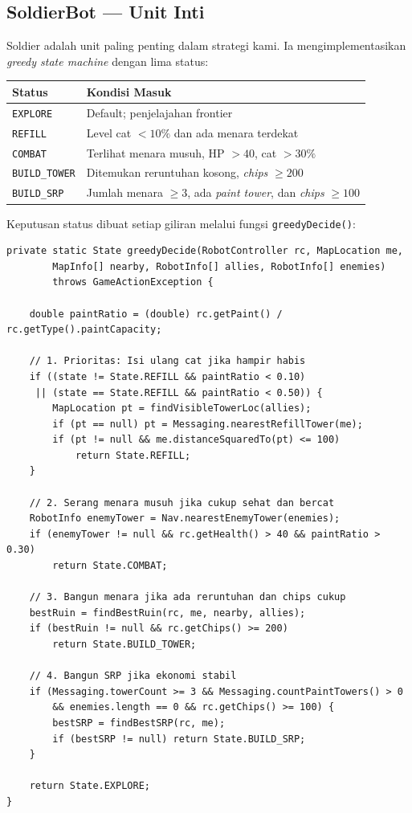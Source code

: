 \documentclass[12pt, a4paper]{article}
\begin{document}
\subsection{SoldierBot --- Unit Inti}

Soldier adalah unit paling penting dalam strategi kami. Ia mengimplementasikan
\textit{greedy state machine} dengan lima status:

\begin{center}
\begin{tabular}{ll}
\toprule
\textbf{Status} & \textbf{Kondisi Masuk} \\
\midrule
\texttt{EXPLORE}     & Default; penjelajahan frontier \\
\texttt{REFILL}      & Level cat $< 10\%$ dan ada menara terdekat \\
\texttt{COMBAT}      & Terlihat menara musuh, HP $> 40$, cat $> 30\%$ \\
\texttt{BUILD\_TOWER} & Ditemukan reruntuhan kosong, \textit{chips} $\geq 200$ \\
\texttt{BUILD\_SRP}  & Jumlah menara $\geq 3$, ada \textit{paint tower}, dan \textit{chips} $\geq 100$ \\
\bottomrule
\end{tabular}
\end{center}

\noindent Keputusan status dibuat setiap giliran melalui fungsi \texttt{greedyDecide()}:

\begin{lstlisting}[caption={Fungsi greedy decision SoldierBot (disederhanakan)}]
private static State greedyDecide(RobotController rc, MapLocation me,
        MapInfo[] nearby, RobotInfo[] allies, RobotInfo[] enemies)
        throws GameActionException {

    double paintRatio = (double) rc.getPaint() / rc.getType().paintCapacity;

    // 1. Prioritas: Isi ulang cat jika hampir habis
    if ((state != State.REFILL && paintRatio < 0.10)
     || (state == State.REFILL && paintRatio < 0.50)) {
        MapLocation pt = findVisibleTowerLoc(allies);
        if (pt == null) pt = Messaging.nearestRefillTower(me);
        if (pt != null && me.distanceSquaredTo(pt) <= 100)
            return State.REFILL;
    }

    // 2. Serang menara musuh jika cukup sehat dan bercat
    RobotInfo enemyTower = Nav.nearestEnemyTower(enemies);
    if (enemyTower != null && rc.getHealth() > 40 && paintRatio > 0.30)
        return State.COMBAT;

    // 3. Bangun menara jika ada reruntuhan dan chips cukup
    bestRuin = findBestRuin(rc, me, nearby, allies);
    if (bestRuin != null && rc.getChips() >= 200)
        return State.BUILD_TOWER;

    // 4. Bangun SRP jika ekonomi stabil
    if (Messaging.towerCount >= 3 && Messaging.countPaintTowers() > 0
        && enemies.length == 0 && rc.getChips() >= 100) {
        bestSRP = findBestSRP(rc, me);
        if (bestSRP != null) return State.BUILD_SRP;
    }

    return State.EXPLORE;
}
\end{lstlisting}
\end{document}
